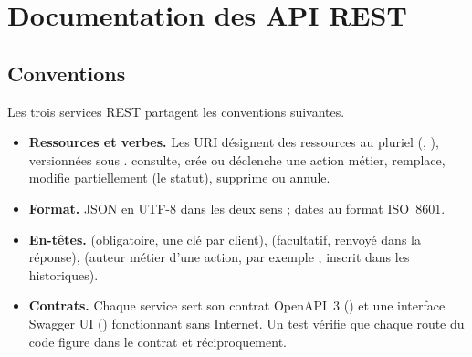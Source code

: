 \chapter{Documentation des API REST}\label{chap:rest}

\section{Conventions}

Les trois services REST partagent les conventions suivantes.

\begin{itemize}
  \item \textbf{Ressources et verbes.} Les URI désignent des ressources au pluriel (, ), versionnées sous .  consulte,  crée ou déclenche une action métier,  remplace,  modifie partiellement (le statut),  supprime ou annule.
  \item \textbf{Format.} JSON en UTF-8 dans les deux sens ; dates au format ISO~8601.
  \item \textbf{En-têtes.}  (obligatoire, une clé par client),  (facultatif, renvoyé dans la réponse),  (auteur métier d'une action, par exemple , inscrit dans les historiques).
  \item \textbf{Contrats.} Chaque service sert son contrat OpenAPI~3 () et une interface Swagger UI () fonctionnant sans Internet. Un test vérifie que chaque route du code figure dans le contrat et réciproquement.
\end{itemize}


